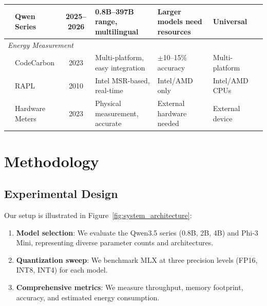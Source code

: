 \documentclass[journal]{IEEEtran}
\begin{document}
\begin{table}[htbp]
{\begin{tabular}{l l c l l l l}
 & Qwen Series & 2025--2026 & 0.8B--397B range, multilingual & Larger models need resources & Universal & \cite{qwen2025technical} \\
\midrule
\multicolumn{7}{l}{\textit{Energy Measurement}} \\
\midrule
 & CodeCarbon & 2023 & Multi-platform, easy integration & $\pm$10--15\% accuracy & Multi-platform & \cite{codecarbon2023} \\
 & RAPL & 2010 & Intel MSR-based, real-time & Intel/AMD only & Intel/AMD CPUs & \cite{david2010rapl} \\
 & Hardware Meters & 2023 & Physical measurement, accurate & External hardware needed & External device & \cite{conti2023multiport} \\
\bottomrule
\end{tabular}%
}
\end{table}

\section{Methodology}

\subsection{Experimental Design}

Our setup is illustrated in Figure~\ref{fig:system_architecture}:

\begin{enumerate}[leftmargin=*,nosep]
    \item \textbf{Model selection}: We evaluate the Qwen3.5 series (0.8B, 2B, 4B) and Phi-3 Mini, representing diverse parameter counts and architectures.
    \item \textbf{Quantization sweep}: We benchmark MLX at three precision levels (FP16, INT8, INT4) for each model.
    \item \textbf{Comprehensive metrics}: We measure throughput, memory footprint, accuracy, and estimated energy consumption.
\end{enumerate}
\end{document}
